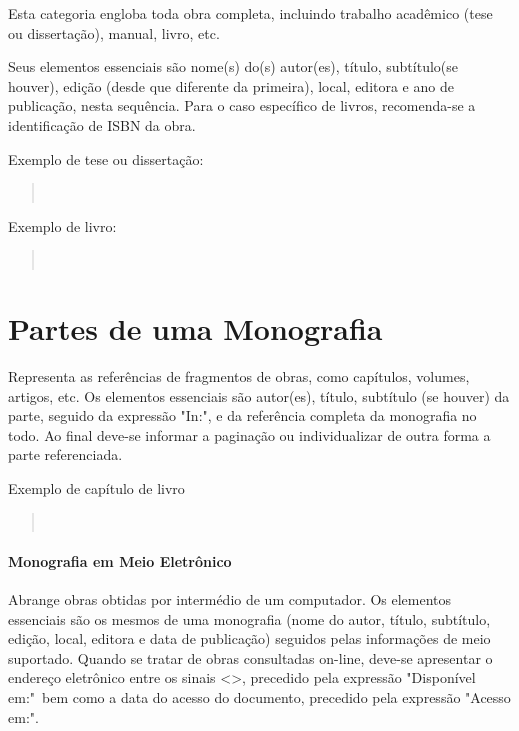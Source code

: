 \documentclass[repeatfields,xlists,xpacks,oneside,yearsonly]{ufrgscca}
\begin{document}
\begin{appendix}
        Esta categoria engloba toda obra completa, incluindo trabalho acadêmico
        (tese ou dissertação), manual, livro, etc.

        Seus elementos essenciais são nome(s) do(s) autor(es), título, subtítulo(se
        houver), edição (desde que diferente da primeira), local, editora e ano de
        publicação, nesta sequência. Para o caso específico de livros,
        recomenda-se a identificação de ISBN da obra.

        Exemplo de tese ou dissertação:\\

        \begin{quote}\noindent{}\\\end{quote}

        Exemplo de livro:\\

        \begin{quote}\noindent{}\\\end{quote}


        \section{Partes de uma Monografia}

        Representa as referências de fragmentos de obras, como capítulos, volumes,
        artigos, etc. Os elementos essenciais são autor(es), título, subtítulo (se
        houver) da parte, seguido da expressão "In:", e da referência completa da
        monografia no todo. Ao final deve-se informar a paginação ou individualizar
        de outra forma a parte referenciada.

        Exemplo de capítulo de livro\\

        \begin{quote}\noindent{}\\\end{quote}


        \paragraph{Monografia em Meio Eletrônico}

        Abrange obras obtidas por intermédio de um computador. Os elementos
        essenciais são os mesmos de uma monografia (nome do autor, título,
        subtítulo, edição, local, editora e data de publicação) seguidos pelas
        informações de meio suportado. Quando se tratar de obras consultadas
        on-line, deve-se apresentar o endereço eletrônico entre os sinais <>,
        precedido pela expressão "Disponível em:"\ bem como a data do acesso do
        documento, precedido pela expressão "Acesso em:".


\end{appendix}
\end{document}
